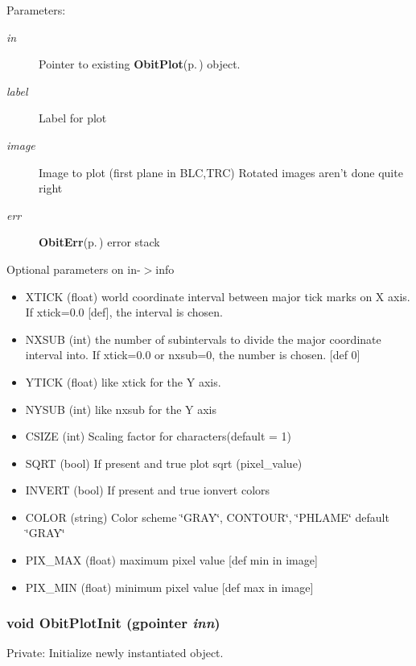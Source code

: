 \begin{Desc}
\item[Parameters:]
\begin{description}
\item[{\em in}]Pointer to existing {\bf Obit\-Plot}{\rm (p.\,\pageref{structObitPlot})} object. \item[{\em label}]Label for plot \item[{\em image}]Image to plot (first plane in BLC,TRC) Rotated images aren't done quite right \item[{\em err}]{\bf Obit\-Err}{\rm (p.\,\pageref{structObitErr})} error stack\end{description}
\end{Desc}
Optional parameters on in-$>$info \begin{itemize}
\item XTICK (float) world coordinate interval between major tick marks on X axis. If xtick=0.0 [def], the interval is chosen. \item NXSUB (int) the number of subintervals to divide the major coordinate interval into. If xtick=0.0 or nxsub=0, the number is chosen. [def 0] \item YTICK (float) like xtick for the Y axis. \item NYSUB (int) like nxsub for the Y axis \item CSIZE (int) Scaling factor for characters(default = 1) \item SQRT (bool) If present and true plot sqrt (pixel\_\-value) \item INVERT (bool) If present and true ionvert colors \item COLOR (string) Color scheme \char`\"{}GRAY\char`\"{}, CONTOUR\char`\"{}, \char`\"{}PHLAME\char`\"{} default \char`\"{}GRAY\char`\"{} \item PIX\_\-MAX (float) maximum pixel value [def min in image] \item PIX\_\-MIN (float) minimum pixel value [def max in image] \end{itemize}
\subsubsection{\setlength{\rightskip}{0pt plus 5cm}void Obit\-Plot\-Init (gpointer {\em inn})}\label{ObitPlot_8c_a3}


Private: Initialize newly instantiated object. 


